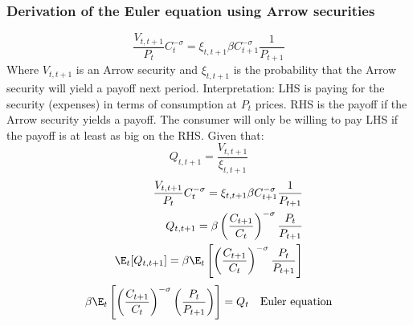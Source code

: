 \subsubsection{Derivation of the Euler equation using Arrow securities}
\begin{equation}
    \frac{V_{t,t+1}}{P_t}C_{t}^{-\sigma} = \xi_{t,t+1} \beta C_{t+1}^{-\sigma} \frac{1}{P_{t+1}} \label{eq:introduces_arrow_securities}
\end{equation}
Where $V_{t,t+1}$ is an Arrow security and $\xi_{t,t+1}$ is the probability that the Arrow security will yield a payoff next period. Interpretation: LHS is paying for the security (expenses) in terms of consumption at $P_t$ prices. RHS is the payoff if the Arrow security yields a payoff. The consumer will only be willing to pay LHS if the payoff is at least as big on the RHS.
Given that:
\begin{equation}
    Q_{t,t+1} = \frac{V_{t,t+1}}{\xi_{t,t+1}}
\end{equation}
\begin{align}
    \frac{V_{t,t+1}}{P_t}C_{t}^{-\sigma} = \xi_{t,t+1} \beta C_{t+1}^{-\sigma} \frac{1}{P_{t+1}} \\
    Q_{t,t+1} = \beta \left(\frac{C_{t+1}}{C_{t}}\right)^{-\sigma} \frac{P_t}{P_{t+1}}           \\
    \E_t [Q_{t,t+1}] = \beta \E_t\left[\left(\frac{C_{t+1}}{C_{t}}\right)^{-\sigma} \frac{P_t}{P_{t+1}}\right]
\end{align}
\begin{align}
    \beta\E_t\left[\left(\frac{C_{t+1}}{C_{t}}\right)^{-\sigma} \left(\frac{P_{t}}{ P_{t+1}}\right)\right]             = Q_t &  & \text{Euler equation}
\end{align}
\newpage